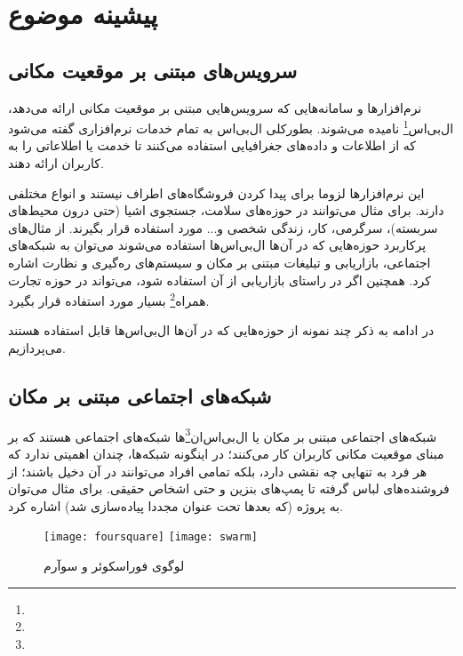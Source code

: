 \chapter{پیشینه موضوع}

\section{سرویس‌های مبتنی بر موقعیت مکانی}

نرم‌افزارها و سامانه‌هایی که سرویس‌هایی مبتنی بر موقعیت مکانی ارائه می‌دهد، ال‌بی‌اس\footnote{} نامیده می‌شوند. بطورکلی ال‌بی‌اس به تمام خدمات نرم‌افزاری گفته می‌شود که از اطلاعات و داده‌های جغرافیایی استفاده می‌کنند تا خدمت یا اطلاعاتی را به کاربران ارائه دهند\cite{hist:1}.

این نرم‌افزارها لزوما برای پیدا کردن فروشگاه‌های اطراف نیستند و انواع مختلفی دارند. برای مثال می‌توانند در حوزه‌های سلامت، جستجوی اشیا (حتی درون محیط‌های سربسته)، سرگرمی، کار، زندگی شخصی و... مورد استفاده قرار بگیرند. از مثال‌های پرکاربرد حوزه‌هایی که در آن‌ها ال‌بی‌اس‌ها استفاده می‌شوند می‌توان به شبکه‌های اجتماعی، بازاریابی و تبلیغات مبتنی بر مکان و سیستم‌های ره‌گیری و نظارت اشاره کرد. همچنین اگر در راستای بازاریابی از آن استفاده شود، می‌تواند در حوزه تجارت همراه\footnote{} بسیار مورد استفاده قرار بگیرد\cite{hist:1}.

در ادامه به ذکر چند نمونه از حوزه‌هایی که در آن‌ها ال‌بی‌اس‌ها قابل استفاده هستند می‌پردازیم.

\section{شبکه‌های اجتماعی مبتنی بر مکان}


شبکه‌های اجتماعی مبتنی بر مکان یا ال‌بی‌اس‌ان‌\footnote{}ها شبکه‌های اجتماعی هستند که بر مبنای موقعیت مکانی کاربران کار می‌کنند؛ در اینگونه شبکه‌ها، چندان اهمیتی ندارد که هر فرد به تنهایی چه نقشی دارد، بلکه تمامی افراد می‌توانند در آن دخیل باشند؛ از فروشنده‌های لباس گرفته تا پمپ‌های بنزین و حتی اشخاص حقیقی. برای مثال می‌توان به پروژه \cite{hist:2} (که بعدها تحت عنوان \cite{hist:3} مجددا پیاده‌سازی شد) اشاره کرد.

\begin{figure}[b]
	\centering
	\texttt{[image: foursquare]}
	\texttt{[image: swarm]}
	\caption{لوگوی فوراسکوئر و سوآرم}
	\label{fig:foursquare}
\end{figure}

\newpage

